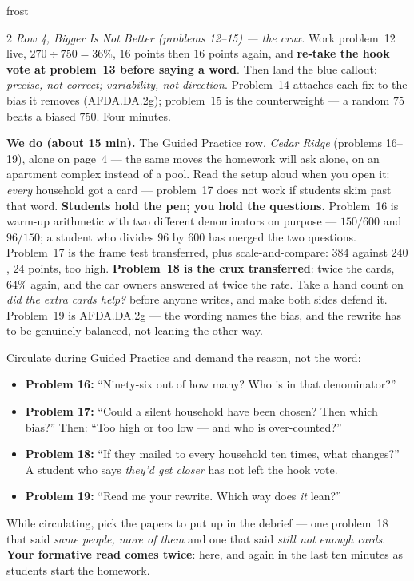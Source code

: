 \documentclass[10pt]{article}
\begin{document}
\begin{skillbox}{frost}
\begin{multicols}{2}
\emph{Row 4, Bigger Is Not Better (problems 12--15) --- the crux.} Work problem~12 live,
$270 \div 750 = 36\%$, $16$ points then $16$ points again, and \textbf{re-take the hook vote at
problem~13 before saying a word}. Then land the blue callout: \emph{precise, not correct;
variability, not direction}. Problem~14 attaches each fix to the bias it removes (AFDA.DA.2g);
problem~15 is the counterweight --- a random $75$ beats a biased $750$. Four minutes.

\columnbreak
\textbf{We do (about 15 min).} The Guided Practice row, \emph{Cedar Ridge} (problems 16--19),
alone on page~4 --- the same moves the homework will ask alone, on an apartment complex instead
of a pool. Read the setup aloud when you open it: \emph{every} household got a card ---
problem~17 does not work if students skim past that word. \textbf{Students hold the pen; you
hold the questions.} Problem~16 is warm-up arithmetic with two different denominators on
purpose --- $150/600$ and $96/150$; a student who divides $96$ by $600$ has merged the two
questions. Problem~17 is the frame test transferred, plus scale-and-compare: $384$ against
$240$, $24$ points, too high. \textbf{Problem~18 is the crux transferred}: twice the cards,
$64\%$ again, and the car owners answered at twice the rate. Take a hand count on \emph{did the
extra cards help?} before anyone writes, and make both sides defend it. Problem~19 is
AFDA.DA.2g --- the wording names the bias, and the rewrite has to be genuinely balanced, not
leaning the other way.

Circulate during Guided Practice and demand the reason, not the word:
\begin{itemize}[leftmargin=1.1em, nosep]
  \item \textbf{Problem 16:} ``Ninety-six out of how many? Who is in that denominator?''
  \item \textbf{Problem 17:} ``Could a silent household have been chosen? Then which bias?''
        Then: ``Too high or too low --- and who is over-counted?''
  \item \textbf{Problem 18:} ``If they mailed to every household ten times, what changes?'' A
        student who says \emph{they'd get closer} has not left the hook vote.
  \item \textbf{Problem 19:} ``Read me your rewrite. Which way does \emph{it} lean?''
\end{itemize}
While circulating, pick the papers to put up in the debrief --- one problem~18 that said
\emph{same people, more of them} and one that said \emph{still not enough cards}. \textbf{Your
formative read comes twice}: here, and again in the last ten minutes as students start the
homework.
\end{multicols}
\end{skillbox}
\end{document}
